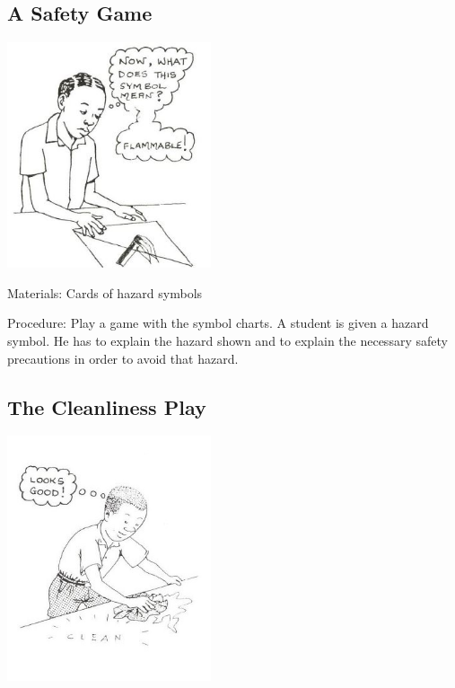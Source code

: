 \begin{multicols}{2}
\subsection{A Safety Game}

\begin{center}
\includegraphics[width=0.45\textwidth]{./img/source/safety-game.jpg}
\end{center}

\begin{description*}
\item[Materials:]{Cards of hazard symbols}
\item[Procedure:]{Play a game with the symbol charts. A
student is given a hazard symbol. He has to
explain the hazard shown and to explain the
necessary safety precautions in order to avoid
that hazard.}
\end{description*}

\columnbreak

\subsection{The Cleanliness Play}

\begin{center}
\includegraphics[width=0.45\textwidth]{./img/source/cleanliness-play.jpg}
\end{center}


\end{multicols}

